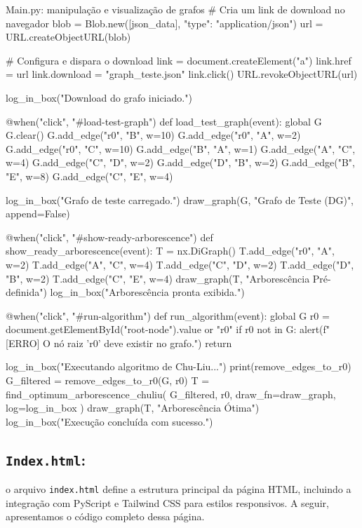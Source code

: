 \begin{pybox}[label={lst:draw_graph}]{Main.py: manipulação e visualização de grafos}
	# Cria um link de download no navegador
	blob = Blob.new([json_data], {"type": "application/json"})
	url = URL.createObjectURL(blob)

	# Configura e dispara o download
	link = document.createElement("a")
	link.href = url
	link.download = "graph_teste.json"
	link.click()
	URL.revokeObjectURL(url)

	log_in_box("Download do grafo iniciado.")

	@when("click", "#load-test-graph")
	def load_test_graph(event):
	global G
	G.clear()
	G.add_edge("r0", "B", w=10)
	G.add_edge("r0", "A", w=2)
	G.add_edge("r0", "C", w=10)
	G.add_edge("B", "A", w=1)
	G.add_edge("A", "C", w=4)
	G.add_edge("C", "D", w=2)
	G.add_edge("D", "B", w=2)
	G.add_edge("B", "E", w=8)
	G.add_edge("C", "E", w=4)

	log_in_box("Grafo de teste carregado.")
	draw_graph(G, "Grafo de Teste (DG)", append=False)

	@when("click", "#show-ready-arborescence")
	def show_ready_arborescence(event):
	T = nx.DiGraph()
	T.add_edge("r0", "A", w=2)
	T.add_edge("A", "C", w=4)
	T.add_edge("C", "D", w=2)
	T.add_edge("D", "B", w=2)
	T.add_edge("C", "E", w=4)
	draw_graph(T, "Arborescência Pré-definida")
	log_in_box("Arborescência pronta exibida.")


	@when("click", "#run-algorithm")
	def run_algorithm(event):
	global G
	r0 = document.getElementById("root-node").value or "r0"
	if r0 not in G:
	alert(f"[ERRO] O nó raiz '{r0}' deve existir no grafo.")
	return

	log_in_box("Executando algoritmo de Chu-Liu...")
	print(remove_edges_to_r0)
	G_filtered = remove_edges_to_r0(G, r0)
	T = find_optimum_arborescence_chuliu(
	G_filtered, r0, draw_fn=draw_graph, log=log_in_box
	)
	draw_graph(T, "Arborescência Ótima")
	log_in_box("Execução concluída com sucesso.")
\end{pybox}

\subsection{\texttt{Index.html}:} o arquivo \texttt{index.html} define a estrutura principal da página HTML, incluindo a integração com PyScript e Tailwind CSS para estilos responsivos. A seguir, apresentamos o código completo dessa página.

